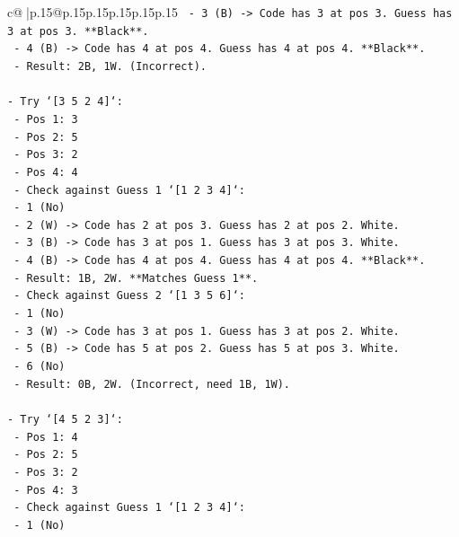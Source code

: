 \documentclass{article}
\begin{document}
{\begin{supertabular}{c@{$\;$}|p{.15\linewidth}@{}p{.15\linewidth}p{.15\linewidth}p{.15\linewidth}p{.15\linewidth}p{.15\linewidth}}
{{{\texttt{        {-}   3 (B) {-}> Code has 3 at pos 3. Guess has 3 at pos 3. **Black**.} \\
\texttt{        {-}   4 (B) {-}> Code has 4 at pos 4. Guess has 4 at pos 4. **Black**.} \\
\texttt{        {-}   Result: 2B, 1W. (Incorrect).} \\
\\ 
\texttt{{-}   Try `{[}3 5 2 4{]}`:} \\
\texttt{    {-}   Pos 1: 3} \\
\texttt{    {-}   Pos 2: 5} \\
\texttt{    {-}   Pos 3: 2} \\
\texttt{    {-}   Pos 4: 4} \\
\texttt{    {-}   Check against Guess 1 `{[}1 2 3 4{]}`:} \\
\texttt{        {-}   1 (No)} \\
\texttt{        {-}   2 (W) {-}> Code has 2 at pos 3. Guess has 2 at pos 2. White.} \\
\texttt{        {-}   3 (B) {-}> Code has 3 at pos 1. Guess has 3 at pos 3. White.} \\
\texttt{        {-}   4 (B) {-}> Code has 4 at pos 4. Guess has 4 at pos 4. **Black**.} \\
\texttt{        {-}   Result: 1B, 2W. **Matches Guess 1**.} \\
\texttt{    {-}   Check against Guess 2 `{[}1 3 5 6{]}`:} \\
\texttt{        {-}   1 (No)} \\
\texttt{        {-}   3 (W) {-}> Code has 3 at pos 1. Guess has 3 at pos 2. White.} \\
\texttt{        {-}   5 (B) {-}> Code has 5 at pos 2. Guess has 5 at pos 3. White.} \\
\texttt{        {-}   6 (No)} \\
\texttt{        {-}   Result: 0B, 2W. (Incorrect, need 1B, 1W).} \\
\\ 
\texttt{{-}   Try `{[}4 5 2 3{]}`:} \\
\texttt{    {-}   Pos 1: 4} \\
\texttt{    {-}   Pos 2: 5} \\
\texttt{    {-}   Pos 3: 2} \\
\texttt{    {-}   Pos 4: 3} \\
\texttt{    {-}   Check against Guess 1 `{[}1 2 3 4{]}`:} \\
\texttt{        {-}   1 (No)} \\
}}}
\end{supertabular}}
\end{document}

